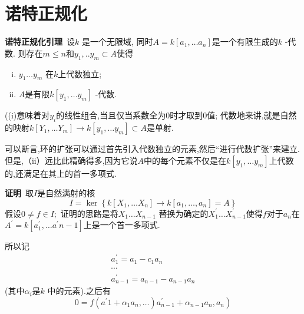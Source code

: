\documentclass[UTF8]{book}
\begin{document}
		
	\section{诺特正规化}
		\textbf{诺特正规化引理}\ 设$k$ 是一个无限域, 同时$A=k\left[a_{1}, \ldots a_{n}\right]$是一个有限生成的$k$ -代数. 则存在$m \leq n$和$y_{1}, . . y_{m} \subset A$使得
		\begin{enumerate}[(i)]
			\item  $y _{1} \ldots y _{ m }$ 在$k$上代数独立;
			\item $A$是有限$k \left[ y _{1}, \dots y _{ m }\right]$ -代数.
		\end{enumerate}
		
		
		((i)意味着对$y_{i}$的线性组合,当且仅当系数全为0时才取到0值; 代数地来讲,就是自然的映射$k \left[ Y _{1}, \ldots Y _{ m }\right] \rightarrow k \left[ y _{1}, \ldots y _{ m }\right] \subset A$是单射.
		
		可以断言,环的扩张可以通过首先引入代数独立的元素,然后“进行代数扩张”来建立.但是,（ii）远比此精确得多,因为它说$ A $中的每个元素不仅是在$ k \left [y _ {1},\ldots y _ {m} \right]$上代数的,还满足在其上的首一多项式.
		
		
		
		\textbf{证明}\ 取$ I $是自然满射的核
		\begin{equation*}
		I =\operatorname{ker}\left\{ k \left[ X _{1}, \ldots X _{ n }\right] \rightarrow k \left[ a _{1}, \ldots, a _{n}\right]= A \right\}
		\end{equation*}
		假设$0 \neq f \in I ;$ 证明的思路是将$X _{1} \ldots X _{ n -1}$ 替换为确定的$X _{1}^{\prime} \ldots X _{ n -1}^{\prime}$使得$f$对于$a _{ n }$在$A ^{\prime}= k \left[ a _{1}^{\prime}, \ldots a ^{\prime} n -1\right]$上是一个首一多项式.
		
		
		
		所以记
		\begin{equation*}
		\begin{array}{c}
		{ a _{1}^{\prime}= a _{1}- c _{1} a _{ n }} \\
		{\cdots} \\
		{ a _{ n -1}^{\prime}= a _{ n -1}- a _{ n -1} a _{ n }}
		\end{array}
		\end{equation*}
		(其中$\alpha_{i}$是$k$ 中的元素).之后有
		\begin{equation*}
		\left.0= f \left(a ^{\prime} 1+\alpha_{1} a _{ n }, \ldots\right) a _{ n -1}^{\prime}+\alpha_{ n -1} a _{ n }, a _{ n }\right)
		\end{equation*}
		
\end{document}
